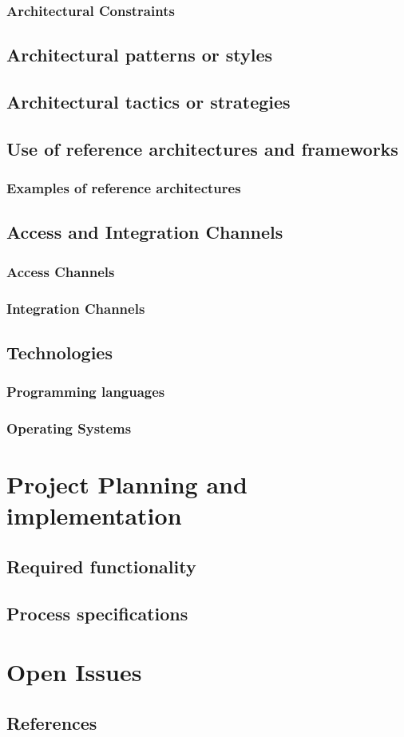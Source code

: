 \documentclass[a4paper,12pt]{article}
\begin{document}
\subsubsection{Architectural Constraints}

\subsection{Architectural patterns or styles}
\subsection{Architectural tactics or strategies}

\newpage
\subsection{Use of reference architectures and frameworks}
\subsubsection{Examples of reference architectures}

\subsection{Access and Integration Channels}
\subsubsection{Access Channels}
\subsubsection{Integration Channels}

\newpage
\subsection{Technologies}	
	\subsubsection{Programming languages}
	
	\subsubsection{Operating Systems}
\newpage
\section{Project Planning and implementation}
	
\subsection{Required functionality}

\subsection{Process specifications}

\newpage
\section{Open Issues}

\subsection{References}
\end{document}
